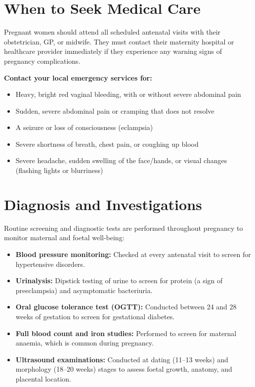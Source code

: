 \section*{When to Seek Medical Care}
Pregnant women should attend all scheduled antenatal visits with their obstetrician, GP, or midwife. They must contact their maternity hospital or healthcare provider immediately if they experience any warning signs of pregnancy complications.

\textbf{Contact your local emergency services for:}
\begin{itemize}
    \item Heavy, bright red vaginal bleeding, with or without severe abdominal pain
    \item Sudden, severe abdominal pain or cramping that does not resolve
    \item A seizure or loss of consciousness (eclampsia)
    \item Severe shortness of breath, chest pain, or coughing up blood
    \item Severe headache, sudden swelling of the face/hands, or visual changes (flashing lights or blurriness)
\end{itemize}

\section*{Diagnosis and Investigations}
Routine screening and diagnostic tests are performed throughout pregnancy to monitor maternal and foetal well-being:

\begin{itemize}
    \item \textbf{Blood pressure monitoring:} Checked at every antenatal visit to screen for hypertensive disorders.
    \item \textbf{Urinalysis:} Dipstick testing of urine to screen for protein (a sign of preeclampsia) and asymptomatic bacteriuria.
    \item \textbf{Oral glucose tolerance test (OGTT):} Conducted between 24 and 28 weeks of gestation to screen for gestational diabetes.
    \item \textbf{Full blood count and iron studies:} Performed to screen for maternal anaemia, which is common during pregnancy.
    \item \textbf{Ultrasound examinations:} Conducted at dating (11--13 weeks) and morphology (18--20 weeks) stages to assess foetal growth, anatomy, and placental location.
\end{itemize}

